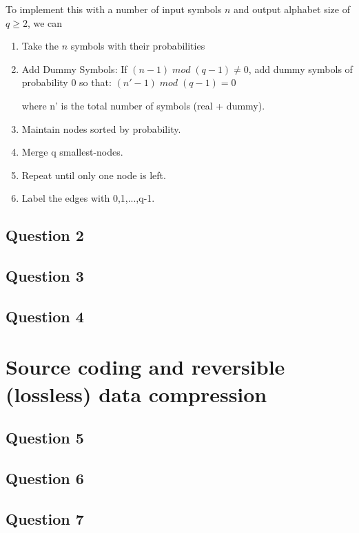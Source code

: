 \documentclass[]{template}
\begin{document}
        \noindent
        To implement this with a number of input symbols $n$ and output alphabet size of $q \geq 2$, we can
        
        \begin{enumerate}
            \item Take the $n$ symbols with their probabilities
            \item Add Dummy Symbols: If $(n-1) \; mod \; (q-1) \neq  0$, add dummy symbols of probability 0 so that:
            $(n' - 1) \; mod \; (q-1)=0$
            
            where n' is the total number of symbols (real + dummy).
            \item Maintain nodes sorted by probability.  
            \item Merge q smallest-nodes.
            \item Repeat until only one node is left.
            \item Label the edges with 0,1,...,q-1.
        \end{enumerate}
        
    \subsection{Question 2}

    \subsection{Question 3}

    \subsection{Question 4}

\section{Source coding and reversible (lossless) data compression}

    \subsection{Question 5}

    \subsection{Question 6}

    \subsection{Question 7}
\end{document}
